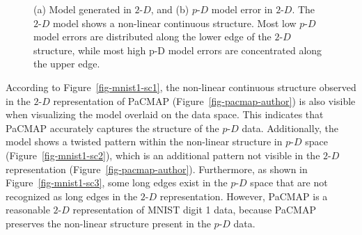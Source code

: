 \documentclass[
  12pt]{article}
\newcommand\pD{$p\text{-}D$}
\newcommand\gD{$2\text{-}D$}
\begin{document}
\begin{figure}[H]


\caption{\label{fig-model-mnist}(a) Model generated in \(2\text{-}D\),
and (b) \(p\text{-}D\) model error in \(2\text{-}D\). The \(2\text{-}D\)
model shows a non-linear continuous structure. Most low \(p\text{-}D\)
model errors are distributed along the lower edge of the \(2\text{-}D\)
structure, while most high p-D model errors are concentrated along the
upper edge.}

\end{figure}%

According to Figure~\ref{fig-mnist1-sc1}, the non-linear continuous
structure observed in the \gD{} representation of PaCMAP
(Figure~\ref{fig-pacmap-author}) is also visible when visualizing the
model overlaid on the data space. This indicates that PaCMAP accurately
captures the structure of the \pD{} data. Additionally, the model shows
a twisted pattern within the non-linear structure in \pD{} space
(Figure~\ref{fig-mnist1-sc2}), which is an additional pattern not
visible in the \gD{} representation (Figure~\ref{fig-pacmap-author}).
Furthermore, as shown in Figure~\ref{fig-mnist1-sc3}, some long edges
exist in the \pD{} space that are not recognized as long edges in the
\gD{} representation. However, PaCMAP is a reasonable \gD{}
representation of MNIST digit 1 data, because PaCMAP preserves the
non-linear structure present in the \pD{} data.
\end{document}
